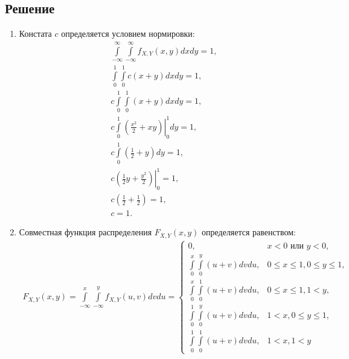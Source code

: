 \documentclass[12pt,a4paper]{article}
\begin{document}
    \subsection*{Решение}
    \begin{enumerate}
        \item Констата $c$ определяется условием нормировки:
        \begin{gather}
            \int \limits_{-\infty}^{\infty} \int \limits_{-\infty}^{\infty} f_{X,Y}(x,y) dx dy = 1 , \\
            \int \limits_{0}^{1} \int \limits_{0}^{1} c ( x + y ) dx dy = 1 , \\
            c \int \limits_{0}^{1} \int \limits_{0}^{1} ( x + y ) dx dy = 1 , \\
            c \int \limits_{0}^{1} \left . \left ( \frac{x^2}{2} + x y \right ) \right |_0^1 dy = 1 , \\
            c \int \limits_{0}^{1} \left ( \frac{1}{2} + y \right ) dy = 1 , \\
            c \left . \left ( \frac{1}{2} y + \frac{y^2}{2} \right ) \right |_0^1 = 1 , \\
            c \left ( \frac{1}{2} + \frac{1}{2} \right ) = 1 , \\
            c = 1 .
        \end{gather}

        \item Совместная функция распределения $F_{X,Y}(x,y)$ определяется равенством:
        \begin{multline}
            F_{X,Y}(x,y)
            = \int \limits_{-\infty}^x \int \limits_{-\infty}^y f_{X,Y}(u,v) dv du
            = \left \{
            \begin{array}{ll}
                0 ,                                                 & x < 0 \text{ или } y < 0 ,     \\
                \int \limits_0^x \int \limits_0^y ( u + v ) dv du , & 0 \le x \le 1, 0 \le y \le 1 , \\
                \int \limits_0^x \int \limits_0^1 ( u + v ) dv du , & 0 \le x \le 1, 1 < y ,         \\
                \int \limits_0^1 \int \limits_0^y ( u + v ) dv du , & 1 < x, 0 \le y \le 1 ,         \\
                \int \limits_0^1 \int \limits_0^1 ( u + v ) dv du , & 1 < x, 1 < y
            \end{array}
            \right .
        \end{multline}


\end{enumerate}
\end{document}
